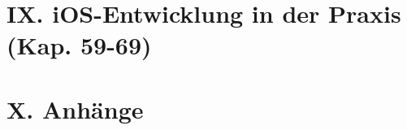 \documentclass[11pt,a4paper,openany]{book}
\begin{document}
\part*{IX. iOS-Entwicklung in der Praxis (Kap. 59-69)}











\appendix
\part*{X. Anhänge}









\end{document}
